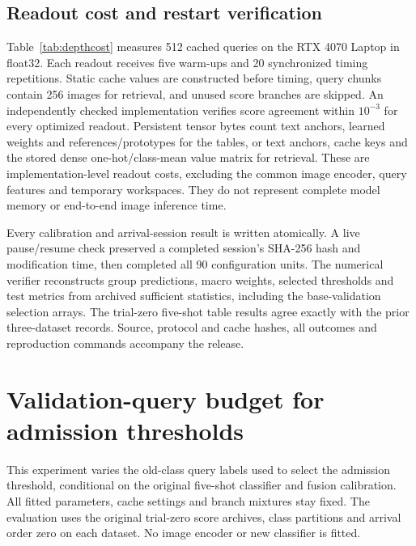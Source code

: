 \documentclass[preprint,review,12pt]{elsarticle}
\begin{document}
\FloatBarrier
\subsection{Readout cost and restart verification}
Table~\ref{tab:depthcost} measures 512 cached queries on the RTX 4070 Laptop in
float32. Each readout receives five warm-ups and 20 synchronized timing
repetitions. Static cache values are constructed before timing, query chunks
contain 256 images for retrieval, and unused score branches are skipped.
An independently checked implementation verifies score agreement within
$10^{-3}$ for every optimized readout. Persistent tensor bytes count text anchors,
learned weights and references/prototypes for the tables, or text anchors, cache
keys and the stored dense one-hot/class-mean value matrix for retrieval. These
are implementation-level readout costs, excluding the common image encoder,
query features and temporary workspaces. They do not represent complete model
memory or end-to-end image inference time.

\begin{table}[htbp]
\centering
\caption{Measured readout latency and persistent tensor storage for a final-session 512-query batch on the same laptop GPU. MiB denotes $2^{20}$ bytes. Cache keys number 4,937 on CIFAR, 553 on Pets and 3,830 on ImageNet-R in partition zero.}
\label{tab:depthcost}
\resizebox{\linewidth}{!}{}
\end{table}

Every calibration and arrival-session result is written atomically. A live
pause/resume check preserved a completed session's SHA-256 hash and modification
time, then completed all 90 configuration units. The numerical verifier
reconstructs group predictions, macro weights, selected thresholds and test
metrics from archived sufficient statistics, including the base-validation
selection arrays. The trial-zero five-shot table results agree exactly with the
prior three-dataset records. Source, protocol and cache hashes, all outcomes and
reproduction commands accompany the release.

\FloatBarrier
\section{Validation-query budget for admission thresholds}
\label{app:validationbudget}
This experiment varies the old-class query labels used to select the admission
threshold, conditional on the original five-shot classifier and fusion
calibration. All fitted parameters, cache settings and branch mixtures stay
fixed. The evaluation uses the original trial-zero score archives, class
partitions and arrival order zero on each dataset. No image encoder or new
classifier is fitted.
\end{document}
